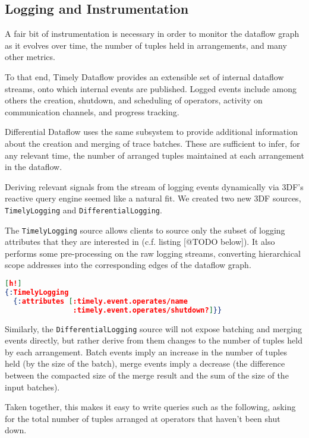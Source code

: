 \documentclass[../index.tex]{subfiles}
\begin{document}
\subsection{Logging and Instrumentation} \label{logging}

A fair bit of instrumentation is necessary in order to monitor the
dataflow graph as it evolves over time, the number of tuples held in
arrangements, and many other metrics.

To that end, Timely Dataflow provides an extensible set of internal
dataflow streams, onto which internal events are published. Logged
events include among others the creation, shutdown, and scheduling of
operators, activity on communication channels, and progress tracking.

Differential Dataflow uses the same subsystem to provide additional
information about the creation and merging of trace batches. These are
sufficient to infer, for any relevant time, the number of arranged
tuples maintained at each arrangement in the dataflow.

Deriving relevant signals from the stream of logging events
dynamically via 3DF's reactive query engine seemed like a natural
fit. We created two new 3DF sources, \texttt{TimelyLogging} and
\texttt{DifferentialLogging}.

The \texttt{TimelyLogging} source allows clients to source only the
subset of logging attributes that they are interested in (c.f. listing
[@TODO below]). It also performs some pre-processing on the raw
logging streams, converting hierarchical scope addresses into the
corresponding edges of the dataflow graph.

\begin{lstlisting}[language=json][h!]
{:TimelyLogging
  {:attributes [:timely.event.operates/name
                :timely.event.operates/shutdown?]}}
\end{lstlisting}

Similarly, the \texttt{DifferentialLogging} source will not expose
batching and merging events directly, but rather derive from them
changes to the number of tuples held by each arrangement. Batch events
imply an increase in the number of tuples held (by the size of the
batch), merge events imply a decrease (the difference between the
compacted size of the merge result and the sum of the size of the
input batches).

Taken together, this makes it easy to write queries such as the
following, asking for the total number of tuples arranged at operators
that haven't been shut down.
\end{document}
